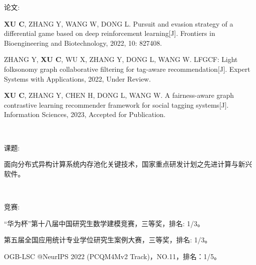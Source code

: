 \newpage
\pagestyle{fancy}
\begin{center}
\heiti{}
\end{center}


论文:

\textbf{XU C}, ZHANG Y, WANG W, DONG L. Pursuit and evasion strategy of a differential game based on deep reinforcement learning[J]. Frontiers in Bioengineering and Biotechnology, 2022, 10: 827408.

ZHANG Y, \textbf{XU C}, WU X, ZHANG Y, DONG L, WANG W. LFGCF: Light folksonomy graph collaborative filtering for tag-aware recommendation[J]. Expert Systems with Applications, 2022, Under Review.

\textbf{XU C}, ZHANG Y, CHEN H, DONG L, WANG W. A fairness-aware graph contrastive learning recommender framework for social tagging systems[J]. Information Sciences, 2023, Accepted for Publication.

\

课题:

面向分布式异构计算系统内存池化关键技术，国家重点研发计划之先进计算与新兴软件。


\

竞赛:

“华为杯”第十八届中国研究生数学建模竞赛，三等奖，排名: 1/3。

第五届全国应用统计专业学位研究生案例大赛，三等奖，排名: 1/3。

OGB-LSC @NeurIPS 2022 (PCQM4Mv2 Track)，NO.11，排名：1/5。